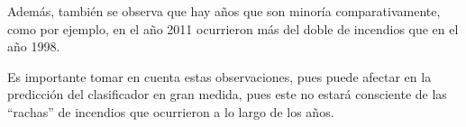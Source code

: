 Además, también se observa que hay años que son minoría comparativamente, como por ejemplo, en el año 2011 ocurrieron más del doble de incendios que en el año 1998. 

Es importante tomar en cuenta estas observaciones, pues puede afectar en la predicción del clasificador en gran medida, pues este no estará consciente de las ``rachas'' de incendios que ocurrieron a lo largo de los años.
















